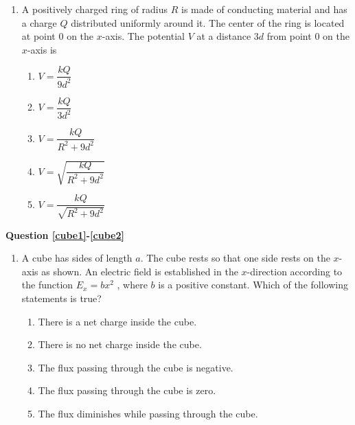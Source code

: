 \documentclass{../../../oss-apphys}
\begin{document}
\begin{multicols}{2}
\begin{enumerate}[leftmargin=18pt]
  \item A positively charged ring of radius $R$ is made of conducting material
    and has a charge $Q$ distributed uniformly around it. The center of the
    ring is located at point $0$ on the $x$-axis. The potential $V$ at a
    distance $3d$ from point $0$ on the $x$-axis is
    \begin{center}
    \end{center}
    \begin{enumerate}[itemsep=4.5pt,leftmargin=18pt,label=(\Alph*)]  
    \item $\displaystyle V=\dfrac{kQ}{9d^2}$
    \item $\displaystyle V=\dfrac{kQ}{3d^2}$
    \item $\displaystyle V=\dfrac{kQ}{R^2+9d^2}$
    \item $\displaystyle V=\sqrt{\dfrac{kQ}{R^2+9d^2}}$
    \item $\displaystyle V=\dfrac{kQ}{\sqrt{R^2+9d^2}}$
    \end{enumerate}
  \end{enumerate}
  
  \textbf{Question \ref{cube1}-\ref{cube2}}
  \begin{enumerate}[leftmargin=18pt,resume]
  \item A cube has sides of length $a$. The cube rests so that one side rests on
    the $x$-axis as shown. An electric field is established in the $x$-direction
    according to the function $E_x=bx^2$ , where $b$ is a positive constant.
    Which of the following statements is true?
    \label{cube1}
    \vspace{-.15in}
    \begin{enumerate}[nosep,leftmargin=18pt,label=(\Alph*)]
    \item\vspace{-.2in}There is a net charge inside the cube.
    \item There is no net charge inside the cube.
    \item The flux passing through the cube is negative.
    \item The flux passing through the cube is zero.
    \item The flux diminishes while passing through the cube.
    \end{enumerate}
    \columnbreak
    

\end{enumerate}
\end{multicols}
\end{document}
